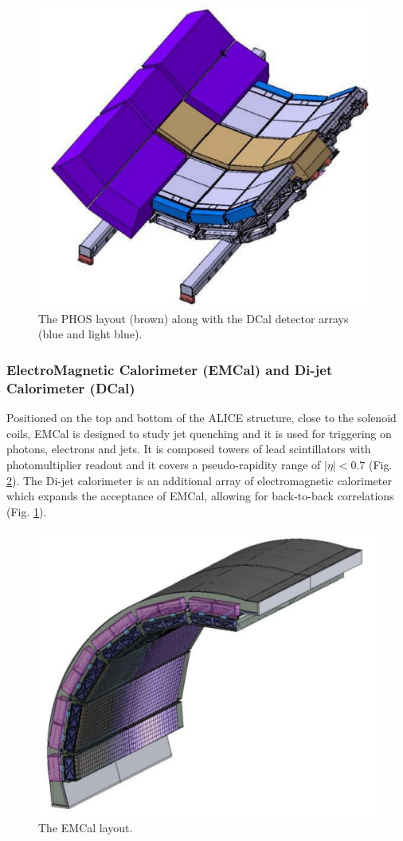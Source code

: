 \begin{figure}[!h]
\begin{center}
\includegraphics[width=0.5\linewidth]{Chapters/Introduction/Figs/phos.pdf}
\caption{The PHOS layout (brown) along with the DCal detector arrays (blue and light blue).}
\label{fig:PHOS}
\end{center}
\end{figure}

\subsubsection{ElectroMagnetic Calorimeter (EMCal) and Di-jet Calorimeter (DCal)}
Positioned on the top and bottom of the ALICE structure, close to the solenoid coils, EMCal is designed to study jet quenching and it is used for triggering on photons, electrons and jets.
It is composed towers of lead scintillators with photomultiplier readout and it covers a pseudo-rapidity range of $|\eta| < 0.7$ (Fig. \ref{fig:EMCAL}).
The Di-jet calorimeter is an additional array of electromagnetic calorimeter which expands the acceptance of EMCal, allowing for back-to-back correlations (Fig. \ref{fig:PHOS}).

\begin{figure}[!h]
\begin{center}
\includegraphics[width=0.5\linewidth]{Chapters/Introduction/Figs/emcal.pdf}
\caption{The EMCal layout.}
\label{fig:EMCAL}
\end{center}
\end{figure}

